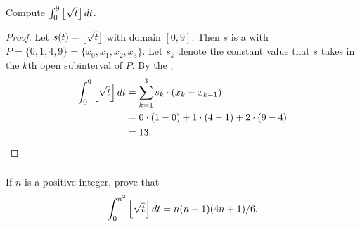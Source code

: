 \documentclass{report}
\begin{document}
\subsubsection{}%
\label{ssub:exercise-1.15.7a}

Compute $\int_0^9 \left\lfloor\sqrt{t}\right\rfloor \mathop{dt}$.

\begin{proof}

  Let $s(t) = \left\lfloor\sqrt{t}\right\rfloor$ with domain $[0, 9]$.
  Then $s$ is a  with 
    $P = \{0, 1, 4, 9\} = \{x_0, x_1, x_2, x_3\}$.
  Let $s_k$ denote the constant value that $s$ takes in the $k$th open
    subinterval of $P$.
  By the ,
    \begin{align*}
      \int_0^9 \left\lfloor\sqrt{t}\right\rfloor \mathop{dt}
        & = \sum_{k=1}^3 s_k \cdot (x_k - x_{k-1}) \\
        & = 0 \cdot (1 - 0) + 1 \cdot (4 - 1) + 2 \cdot (9 - 4) \\
        & = 13.
    \end{align*}

\end{proof}

\subsubsection{}%
\label{ssub:exercise-1.15.7b}

If $n$ is a positive integer, prove that
  $$\int_0^{n^2} \left\lfloor\sqrt{t}\right\rfloor \mathop{dt} = n(n - 1)(4n + 1) / 6.$$
\end{document}
